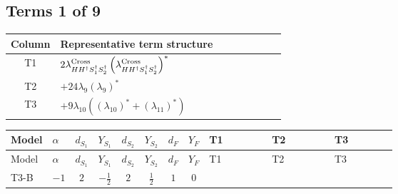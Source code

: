 \documentclass[8pt]{article}
\begin{document}
\begin{landscape}
\subsection*{Terms 1 of 9}
\begin{center}
\begin{tabular}{@{}c >{\raggedright\arraybackslash}p{0.82\linewidth}@{}}
\toprule
Column & Representative term structure \\
\midrule
T1 & \(\displaystyle 2 {\lambda_{H H^\dagger S_1^\dagger S_2^\dagger}^{\rm Cross}} \left({\lambda_{H H^\dagger S_1^\dagger S_2^\dagger}^{\rm Cross}}\right)^{*}\) \\
\midrule
T2 & \(\displaystyle +24 {\lambda_9} \left({\lambda_9}\right)^{*}\) \\
\midrule
T3 & \(\displaystyle +9 {\lambda_{10}} (\left({\lambda_{10}}\right)^{*}+\left({\lambda_{11}}\right)^{*})\) \\
\midrule
\bottomrule
\end{tabular}
\end{center}
\smallskip
\tiny
\begin{longtable}{@{}llcccccc >{\raggedright\arraybackslash}p{0.21\linewidth} >{\raggedright\arraybackslash}p{0.21\linewidth} >{\raggedright\arraybackslash}p{0.21\linewidth}@{}}
\toprule
Model & $\alpha$ & $d_{S_1}$ & $Y_{S_1}$ & $d_{S_2}$ & $Y_{S_2}$ & $d_F$ & $Y_F$ & T1 & T2 & T3 \\
\midrule
\endfirsthead
\toprule
Model & $\alpha$ & $d_{S_1}$ & $Y_{S_1}$ & $d_{S_2}$ & $Y_{S_2}$ & $d_F$ & $Y_F$ & T1 & T2 & T3 \\
\midrule
\endhead
T3-B & $-1$ & $2$ & $-\frac{1}{2}$ & $2$ & $\frac{1}{2}$ & $1$ & $0$ & \scriptsize\adjustbox{max width=\linewidth}{$\begin{gathered} 2 {\lambda_{H H^\dagger S_1^\dagger S_2^\dagger}^{\rm Cross}} \left({\lambda_{H H^\dagger S_1^\dagger S_2^\dagger}^{\rm Cross}}\right)^{*}\end{gathered}$} & \scriptsize\adjustbox{max width=\linewidth}{$\begin{gathered} +24 {\lambda_9} \left({\lambda_9}\right)^{*}\end{gathered}$} & \scriptsize\adjustbox{max width=\linewidth}{$\begin{gathered} +9 {\lambda_{10}} (\left({\lambda_{10}}\right)^{*}+\left({\lambda_{11}}\right)^{*}) \\ +9 {\lambda_{11}} (\left({\lambda_{10}}\right)^{*}+\left({\lambda_{11}}\right)^{*})\end{gathered}$} \\

\end{longtable}
\end{landscape}
\end{document}
